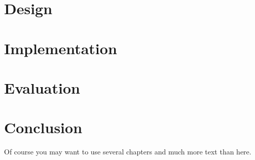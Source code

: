 \documentclass[bsc,frontabs,twoside,singlespacing,normalheadings,parskip,logo]{infthesis}     %
\begin{document}
\chapter{Design}

\chapter{Implementation}

\chapter{Evaluation}

\chapter{Conclusion}

Of course
you may want to use several chapters and much more text than here.



\end{document}
